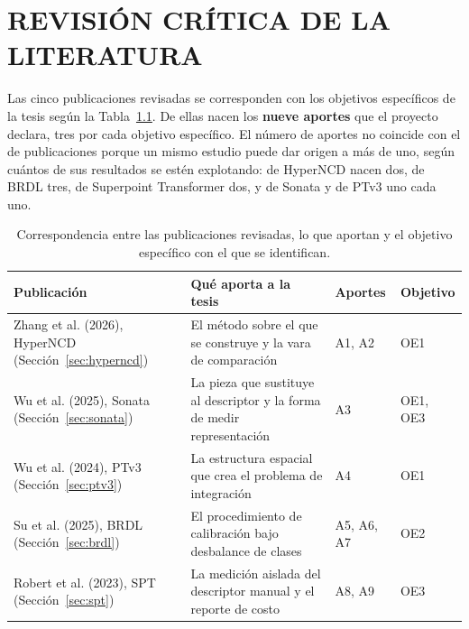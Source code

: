 
\chapter{REVISIÓN CRÍTICA DE LA LITERATURA}
\label{cap:revision}

Las cinco publicaciones revisadas se corresponden con los objetivos específicos
de la tesis según la Tabla~\ref{tab:mapa-estudios}. De ellas nacen los
\textbf{nueve aportes} que el proyecto declara, tres por cada objetivo
específico. El número de aportes no coincide con el de publicaciones porque un
mismo estudio puede dar origen a más de uno, según cuántos de sus resultados se
estén explotando: de HyperNCD nacen dos, de BRDL tres, de Superpoint Transformer
dos, y de Sonata y de PTv3 uno cada uno.

\begin{table}[htbp]
\centering
\small
\caption{Correspondencia entre las publicaciones revisadas, lo que aportan y el
objetivo específico con el que se identifican.}
\label{tab:mapa-estudios}
\begin{tabular}{@{}p{4.0cm}p{4.5cm}p{1.8cm}p{1.9cm}@{}}
\hline
\textbf{Publicación} & \textbf{Qué aporta a la tesis} & \textbf{Aportes} &
\textbf{Objetivo} \\
\hline
Zhang et al. (2026), HyperNCD \newline (Sección~\ref{sec:hyperncd})
& El método sobre el que se construye y la vara de comparación
& A1, A2 & OE1 \\
Wu et al. (2025), Sonata \newline (Sección~\ref{sec:sonata})
& La pieza que sustituye al descriptor y la forma de medir representación
& A3 & OE1, OE3 \\
Wu et al. (2024), PTv3 \newline (Sección~\ref{sec:ptv3})
& La estructura espacial que crea el problema de integración
& A4 & OE1 \\
Su et al. (2025), BRDL \newline (Sección~\ref{sec:brdl})
& El procedimiento de calibración bajo desbalance de clases
& A5, A6, A7 & OE2 \\
Robert et al. (2023), SPT \newline (Sección~\ref{sec:spt})
& La medición aislada del descriptor manual y el reporte de costo
& A8, A9 & OE3 \\
\hline
\end{tabular}
\end{table}

